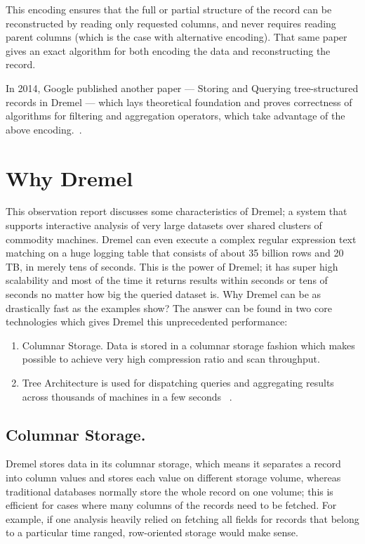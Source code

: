 \documentclass[9pt,twocolumn,twoside]{styles/osajnl}
\begin{document}
This encoding ensures that the full or partial structure of the record can be reconstructed by reading only requested columns, and never requires reading parent columns (which is the case with alternative encoding). That same paper gives an exact algorithm for both encoding the data and reconstructing the record.

In 2014, Google published another paper — Storing and Querying tree-structured records in Dremel — which lays theoretical foundation and proves correctness of algorithms for filtering and aggregation operators, which take advantage of the above encoding.~\cite{www-dremel}.

\section{Why Dremel}

This observation report discusses some characteristics of Dremel; a system that supports interactive analysis of very large datasets over shared clusters of commodity machines.  Dremel can even execute a complex regular expression text matching on a huge logging table that consists of about 35 billion rows and 20 TB, in merely tens of seconds. This is the power of Dremel; it has super high scalability and most of the time it returns results within seconds or tens of seconds no matter how big the queried dataset is.  Why Dremel can be as drastically fast as the examples show? The answer can be found in two core technologies which gives Dremel this unprecedented performance: 

\begin{enumerate}
  \item 	Columnar Storage. Data is stored in a columnar storage fashion which makes possible to achieve very high compression ratio and scan throughput.
  \item Tree Architecture is used for dispatching queries and aggregating results across thousands of machines in a few seconds ~\cite{paper-dremel}.
\end{enumerate}

\subsection{Columnar Storage.}
Dremel stores data in its columnar storage, which means it separates a record into column values and stores each value on different storage volume, whereas traditional databases normally store the whole record on one volume; this is efficient for cases where many columns of the records need to be fetched. For example, if one analysis heavily relied on fetching all fields for records that belong to a particular time ranged, row-oriented storage would make sense. 
\end{document}
